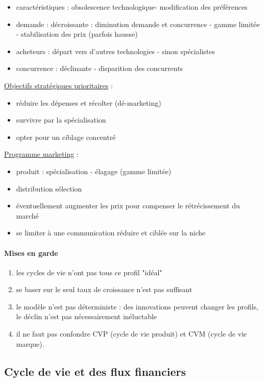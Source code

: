 			\begin{itemize}
				\item caractéristiques : obsolescence technologique-  modification des préférences
				\item demande : décroissante : diminution demande et concurrence - gamme limitée - stabilisation des prix (parfois hausse)
				\item acheteurs : départ vers d'autres technologies - sinon spécialistes
				\item concurrence : déclinante - disparition des concurrents
			\end{itemize}
			\n
			\underline{Objectifs stratégiques prioritaires} :
			
			\begin{itemize}
				\item réduire les dépenses et récolter (dé-marketing)
				\item survivre par la spécialisation
				\item opter pour un ciblage concentré
			\end{itemize}
			\n
			\underline{Programme marketing} :
			
			\begin{itemize}
				\item produit : spécialisation - élagage (gamme limitée)
				\item distribution sélection
				\item éventuellement augmenter les prix pour compenser le rétrécissement du marché
				\item se limiter à une communication réduire et ciblée sur la niche
			\end{itemize}
			
	\paragraph{Mises en garde}
		
	\begin{enumerate}
		\item les cycles de vie n'ont pas tous ce profil "idéal"
		\item se baser sur le seul taux de croissance n'est pas suffisant
		\item le modèle n'est pas déterministe : des innovations peuvent changer les profils, le déclin n'est pas nécessairement inéluctable
		\item il ne faut pas confondre CVP (cycle de vie produit) et CVM (cycle de vie marque).
	\end{enumerate}
		
		
		\subsection{Cycle de vie et des flux financiers}
		
		
		
		